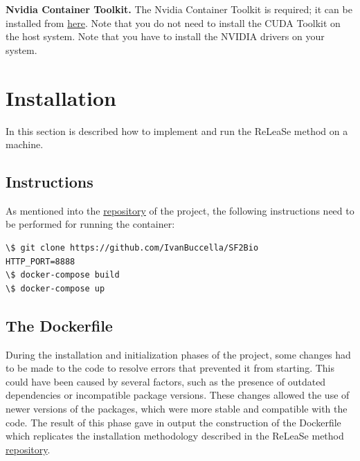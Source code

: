 \documentclass[conference]{IEEEtran}
\newcommand{\mypar}[1]{{\bf #1.}}
\begin{document}
\mypar{Nvidia Container Toolkit}
The Nvidia Container Toolkit is required; it can be installed from \href{https://docs.nvidia.com/datacenter/cloud-native/container-toolkit/install-guide.html#install-guide}{here}.
Note that you do not need to install the CUDA Toolkit on the host system.
Note that you have to install the NVIDIA drivers on your system.

\section{Installation}\label{sec:Installation}

In this section is described how to implement and run the ReLeaSe method on a machine.

\subsection{Instructions}\label{sec:Instructions}

As mentioned into the \href{https://github.com/IvanBuccella/SF2Bio#installation}{repository} of the project, the following instructions need to be performed for running the container:

\begin{lstlisting}
\$ git clone https://github.com/IvanBuccella/SF2Bio
HTTP_PORT=8888
\$ docker-compose build
\$ docker-compose up
\end{lstlisting}

\subsection{The Dockerfile}\label{sec:The Dockerfile}

During the installation and initialization phases of the project, some changes had to be made to the code to resolve errors that prevented it from starting. This could have been caused by several factors, such as the presence of outdated dependencies or incompatible package versions. These changes allowed the use of newer versions of the packages, which were more stable and compatible with the code. 
The result of this phase gave in output the construction of the Dockerfile which replicates the installation methodology described in the ReLeaSe method \href{https://github.com/isayev/ReLeaSE#installation-with-anaconda}{repository}. 
\end{document}
